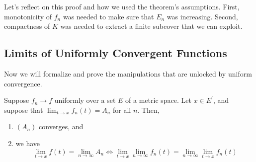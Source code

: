   Let's reflect on this proof and how we used the theorem's assumptions. First, monotonicity of $f_n$ was needed to make sure that $E_n$ was increasing. Second, compactness of $K$ was needed to extract a finite subcover that we can exploit. 

\subsection{Limits of Uniformly Convergent Functions} 

  Now we will formalize and prove the manipulations that are unlocked by uniform convergence. 

  \begin{theorem}
    Suppose $f_n \to f$ uniformly over a set $E$ of a metric space. Let $x \in E^\prime$, and suppose that $\lim_{t \to x} f_n (t) = A_n$ for all $n$. Then, 
    \begin{enumerate}
      \item $(A_n)$ converges, and 
      \item we have 
        \begin{equation}
          \lim_{t \to x} f(t) = \lim_{n \to \infty} A_n \iff \lim_{t \to x} \lim_{n \to \infty} f_n (t) = \lim_{n \to \infty} \lim_{t \to x} f_n (t)
        \end{equation}
    \end{enumerate}
  \end{theorem}
